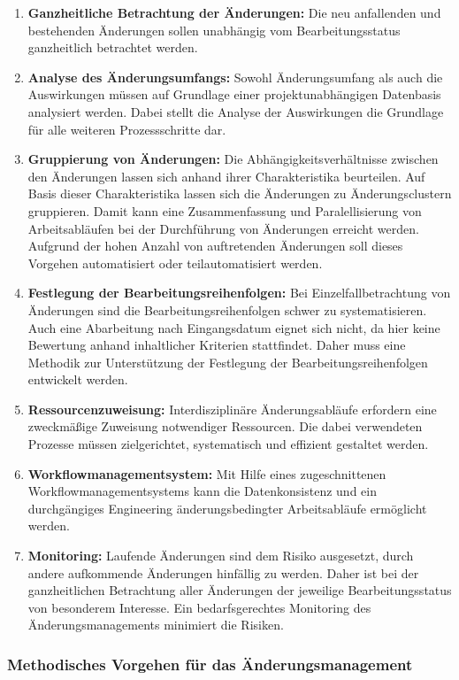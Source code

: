 \begin{enumerate}
 \item \textbf{Ganzheitliche Betrachtung der Änderungen: }
Die neu anfallenden und bestehenden Änderungen sollen unabhängig vom Bearbeitungsstatus ganzheitlich betrachtet werden.  
 \item \textbf{Analyse des Änderungsumfangs: }
 Sowohl Änderungsumfang als auch die Auswirkungen müssen auf Grundlage einer projektunabhängigen Datenbasis analysiert werden. Dabei stellt die Analyse der Auswirkungen die Grundlage für alle weiteren Prozessschritte dar. 
 \item \textbf{Gruppierung von Änderungen: }
  Die Abhängigkeitsverhältnisse zwischen den Änderungen lassen sich anhand ihrer Charakteristika beurteilen. Auf Basis dieser Charakteristika lassen sich die Änderungen zu Änderungsclustern gruppieren. Damit kann eine Zusammenfassung und Paralellisierung von Arbeitsabläufen bei der Durchführung von Änderungen erreicht werden. Aufgrund der hohen Anzahl von auftretenden Änderungen soll dieses Vorgehen automatisiert oder teilautomatisiert werden. 
 \item \textbf{Festlegung der Bearbeitungsreihenfolgen: }
 Bei Einzelfallbetrachtung von Änderungen sind die Bearbeitungsreihenfolgen schwer zu systematisieren. Auch eine Abarbeitung nach Eingangsdatum eignet sich nicht, da hier keine Bewertung anhand inhaltlicher Kriterien stattfindet. 
 Daher muss eine Methodik zur Unterstützung der Festlegung der Bearbeitungsreihenfolgen entwickelt werden. 
 \item \textbf{Ressourcenzuweisung: }
 Interdisziplinäre Änderungsabläufe erfordern eine zweckmäßige Zuweisung notwendiger Ressourcen. Die dabei verwendeten Prozesse müssen zielgerichtet, systematisch und effizient gestaltet werden. 
 \item \textbf{Workflowmanagementsystem: }
 Mit Hilfe eines zugeschnittenen Workflowmanagementsystems kann die Datenkonsistenz und ein durchgängiges Engineering änderungsbedingter Arbeitsabläufe ermöglicht werden. 
 \item \textbf{Monitoring: }
 Laufende Änderungen sind dem Risiko ausgesetzt, durch andere aufkommende Änderungen hinfällig zu werden. Daher ist bei der ganzheitlichen Betrachtung aller Änderungen der jeweilige Bearbeitungsstatus von besonderem Interesse. Ein bedarfsgerechtes Monitoring des Änderungsmanagements minimiert die Risiken. 
\end{enumerate}

\subsubsection*{Methodisches Vorgehen für das Änderungsmanagement}


